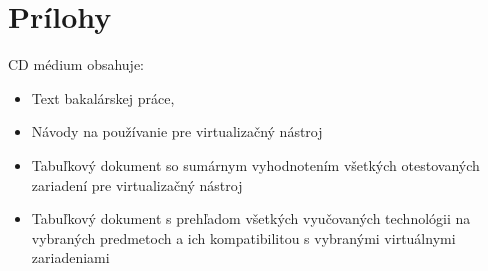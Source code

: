 \chapter{Prílohy}

CD médium obsahuje:

\begin{itemize}
    \item Text bakalárskej práce,
    \item Návody na používanie pre virtualizačný nástroj
    \item Tabuľkový dokument so sumárnym vyhodnotením všetkých otestovaných zariadení pre virtualizačný nástroj
    \item Tabuľkový dokument s prehľadom všetkých vyučovaných technológii na vybraných predmetoch a ich kompatibilitou s vybranými virtuálnymi zariadeniami
\end{itemize}